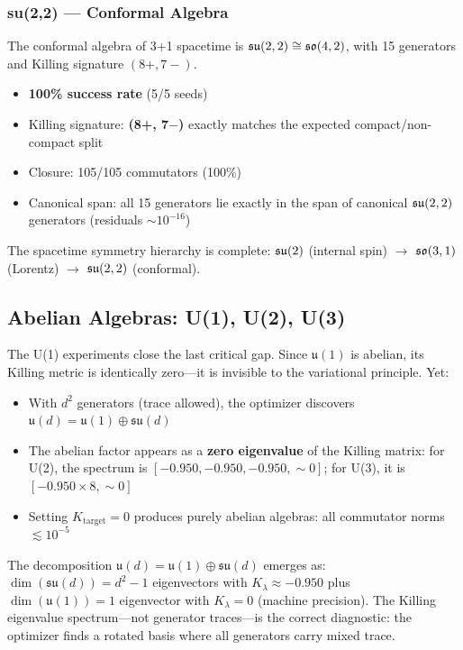 \subsubsection{su(2,2) --- Conformal Algebra}

The conformal algebra of 3+1 spacetime is $\mathfrak{su}(2,2) \cong \mathfrak{so}(4,2)$, with 15 generators and Killing signature $(8+, 7-)$.

\begin{itemize}
\item \textbf{100\% success rate} (5/5 seeds)
\item Killing signature: \textbf{(8+, 7$-$)} exactly matches the expected compact/non-compact split
\item Closure: 105/105 commutators (100\%)
\item Canonical span: all 15 generators lie exactly in the span of canonical $\mathfrak{su}(2,2)$ generators (residuals $\sim 10^{-16}$)
\end{itemize}

The spacetime symmetry hierarchy is complete: $\mathfrak{su}(2)$ (internal spin) $\to$ $\mathfrak{so}(3,1)$ (Lorentz) $\to$ $\mathfrak{su}(2,2)$ (conformal).

\subsection{Abelian Algebras: U(1), U(2), U(3)}\label{sec:abelian}

The U(1) experiments close the last critical gap. Since $\mathfrak{u}(1)$ is abelian, its Killing metric is identically zero---it is invisible to the variational principle. Yet:

\begin{itemize}
\item With $d^2$ generators (trace allowed), the optimizer discovers $\mathfrak{u}(d) = \mathfrak{u}(1) \oplus \mathfrak{su}(d)$
\item The abelian factor appears as a \textbf{zero eigenvalue} of the Killing matrix: for U(2), the spectrum is $[-0.950, -0.950, -0.950, \sim 0]$; for U(3), it is $[-0.950 \times 8, \sim 0]$
\item Setting $K_{\mathrm{target}} = 0$ produces purely abelian algebras: all commutator norms $\lesssim 10^{-5}$
\end{itemize}

The decomposition $\mathfrak{u}(d) = \mathfrak{u}(1) \oplus \mathfrak{su}(d)$ emerges as: $\dim(\mathfrak{su}(d)) = d^2 - 1$ eigenvectors with $K_\lambda \approx -0.950$ plus $\dim(\mathfrak{u}(1)) = 1$ eigenvector with $K_\lambda = 0$ (machine precision). The Killing eigenvalue spectrum---not generator traces---is the correct diagnostic: the optimizer finds a rotated basis where all generators carry mixed trace.


